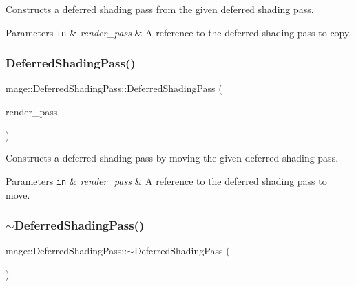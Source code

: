 Constructs a deferred shading pass from the given deferred shading pass.


\begin{DoxyParams}[1]{Parameters}
\mbox{\tt in}  & {\em render\+\_\+pass} & A reference to the deferred shading pass to copy. \\
\hline
\end{DoxyParams}
\hypertarget{classmage_1_1_deferred_shading_pass_a1aff32dc53f6e377728898ba362d0116}{}\label{classmage_1_1_deferred_shading_pass_a1aff32dc53f6e377728898ba362d0116} 
\subsubsection{\texorpdfstring{Deferred\+Shading\+Pass()}{DeferredShadingPass()}\hspace{0.1cm}{\footnotesize\ttfamily [3/3]}}
{\footnotesize\ttfamily mage\+::\+Deferred\+Shading\+Pass\+::\+Deferred\+Shading\+Pass (\begin{DoxyParamCaption}\item[{\hyperlink{classmage_1_1_deferred_shading_pass}{Deferred\+Shading\+Pass} \&\&}]{render\+\_\+pass }\end{DoxyParamCaption})\hspace{0.3cm}{\ttfamily [default]}}

Constructs a deferred shading pass by moving the given deferred shading pass.


\begin{DoxyParams}[1]{Parameters}
\mbox{\tt in}  & {\em render\+\_\+pass} & A reference to the deferred shading pass to move. \\
\hline
\end{DoxyParams}
\hypertarget{classmage_1_1_deferred_shading_pass_a0feba3a73c56e1c07abe19fddd890f76}{}\label{classmage_1_1_deferred_shading_pass_a0feba3a73c56e1c07abe19fddd890f76} 
\subsubsection{\texorpdfstring{$\sim$\+Deferred\+Shading\+Pass()}{~DeferredShadingPass()}}
{\footnotesize\ttfamily mage\+::\+Deferred\+Shading\+Pass\+::$\sim$\+Deferred\+Shading\+Pass (\begin{DoxyParamCaption}{ }\end{DoxyParamCaption})\hspace{0.3cm}{\ttfamily [default]}}

